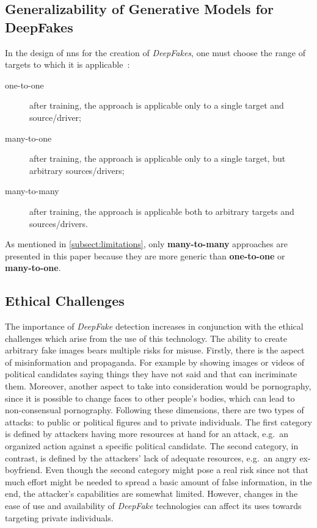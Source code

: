 \subsection{Generalizability of Generative Models for DeepFakes}\label{subsubsect:generalizability-deepfakes}
In the design of \glspl{nn} for the creation of \textit{DeepFakes}, one must choose
the range of targets to which it is applicable~\cite[cf.][]{Mirsky.2020}:
\begin{description}
    \item[one-to-one] after training, the approach is applicable only to a
    single target and source/driver;
    \item[many-to-one] after training, the approach is applicable only to a
    single target, but arbitrary sources/drivers;
    \item[many-to-many] after training, the approach is applicable both to
    arbitrary targets and sources/drivers.
\end{description}
As mentioned in \cref{subsect:limitations}, only \textbf{many-to-many} approaches
are presented in this paper because they are more generic than \textbf{one-to-one} or
\textbf{many-to-one}.

\subsection{Ethical Challenges}
The importance of \textit{DeepFake} detection increases in conjunction with the
ethical challenges which arise from the use of this technology. The ability to
create arbitrary fake images bears multiple risks for misuse. Firstly, there is
the aspect of misinformation and propaganda. For example by showing images or
videos of political candidates saying things they have not said and that can
incriminate them. Moreover, another aspect to take into consideration would be
pornography, since it is possible to change faces to other people's bodies,
which can lead to non-consensual pornography. Following these dimensions, there
are two types of attacks: to public or political figures and to private
individuals. The first category is defined by attackers having more resources at
hand for an attack, e.g.\ an organized action against a specific political
candidate. The second category, in contrast, is defined by the attackers' lack
of adequate resources, e.g.\ an angry ex-boyfriend. Even though the second
category might pose a real risk since not that much effort might be needed to
spread a basic amount of false information, in the end, the attacker's
capabilities are somewhat limited. However, changes in the ease of use and
availability of \textit{DeepFake} technologies can affect its uses towards
targeting private individuals.